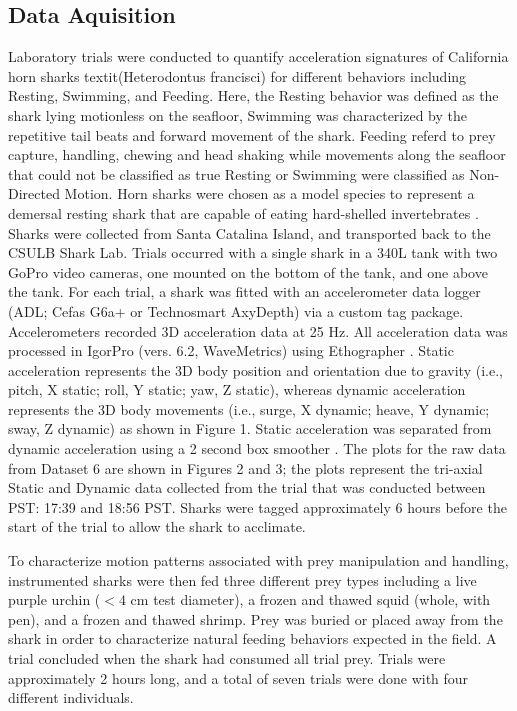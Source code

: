 \documentclass[conference]{IEEEtran}
\begin{document}
\subsection{Data Aquisition}
Laboratory trials were conducted to quantify acceleration signatures of California horn sharks textit{(Heterodontus francisci)} for different behaviors including Resting, Swimming, and Feeding. Here, the Resting behavior was defined as the shark lying motionless on the seafloor, Swimming was characterized by the repetitive tail beats and forward movement of the shark. Feeding referd to prey capture, handling, chewing and head shaking while movements along the seafloor that could not be classified as true Resting or Swimming were classified as Non-Directed Motion. Horn sharks were chosen as a model species to represent a demersal resting shark that are capable of eating hard-shelled invertebrates \cite{8, 9, 10}. Sharks were collected from Santa Catalina Island, and transported back to the CSULB Shark Lab. Trials occurred with a single shark in a 340L tank with two GoPro video cameras, one mounted on the bottom of the tank, and one above the tank. For each trial, a shark was fitted with an accelerometer data logger (ADL; Cefas G6a+ or Technosmart AxyDepth) via a custom tag package. Accelerometers recorded 3D acceleration data at 25 Hz. All acceleration data was processed in IgorPro (vers. 6.2, WaveMetrics) using Ethographer \cite{11}. Static acceleration represents the 3D body position and orientation due to gravity (i.e., pitch, X static; roll, Y static; yaw, Z static), whereas dynamic acceleration represents the 3D body movements (i.e., surge, X dynamic; heave, Y dynamic; sway, Z dynamic) as shown in Figure 1. Static acceleration was separated from dynamic acceleration using a 2 second box smoother \cite{12}. The plots for the raw data from Dataset 6 are shown in Figures 2 and 3; the plots represent the tri-axial Static and Dynamic data collected from the trial that was conducted between PST: 17:39 and 18:56 PST. Sharks were tagged approximately 6 hours before the start of the trial to allow the shark to acclimate. 

To characterize motion patterns associated with prey manipulation and handling, instrumented sharks were then fed three different prey types including a live purple urchin ($<4$ cm test diameter), a frozen and thawed squid (whole, with pen), and a frozen and thawed shrimp. Prey was buried or placed away from the shark in order to characterize natural feeding behaviors expected in the field. A trial concluded when the shark had consumed all trial prey. Trials were approximately 2 hours long, and a total of seven trials were done with four different individuals. 
\end{document}
